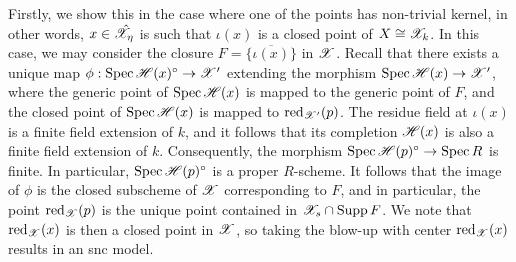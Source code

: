 Firstly, we show this in the case where one of the points has non-trivial kernel, in other words, $x \in \hat{\mathscr{X}}_{\eta}$ is such that $\iota(x)$ is a closed point of $X \cong \mathscr{X}_k$.
In this case, we may consider the closure $F = \overline{\{\iota(x)\}}$ in $\mathscr{X}$.
Recall that there exists a unique map $\phi: \operatorname{Spec} \mathscr{H}(x)^{\circ} \to \mathscr{X}'$ extending the morphism $\operatorname{Spec} \mathscr{H}(x) \to \mathscr{X}'$, where the generic point of $\operatorname{Spec} \mathscr{H}(x)$ is mapped to the generic point of $F$, and the closed point of $\operatorname{Spec} \mathscr{H}(x)$ is mapped to $\operatorname{red}_{\mathscr{X}'}(p)$.
The residue field at $\iota(x)$ is a finite field extension of $k$, and it follows that its completion $\mathscr{H}(x)$ is also a finite field extension of $k$.
Consequently, the morphism $\operatorname{Spec} \mathscr{H}(p)^{\circ} \to \operatorname{Spec} R$ is finite.
In particular, $\operatorname{Spec} \mathscr{H}(p)^{\circ}$ is a proper $R$-scheme.
It follows that the image of $\phi$ is the closed subscheme of $\mathscr{X}$ corresponding to $F$, and in particular, the point $\operatorname{red}_{\mathscr{X}}(p)$ is the unique point contained in $\mathscr{X}_s \cap \operatorname{Supp} F$.
We note that $\operatorname{red}_{\mathscr{X}}(x)$ is then a closed point in $\mathscr{X}$, so taking the blow-up with center $\operatorname{red}_{\mathscr{X}}(x)$ results in an snc model.

